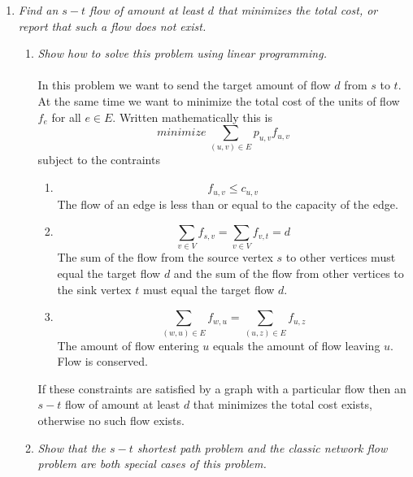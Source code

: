 \documentclass[12pt]{article}
\begin{document}
\begin{enumerate}
  \newpage
  \item \textit{Find an $s-t$ flow of amount at least $d$ that minimizes the
  total cost, or report that such a flow does not exist.}
  \begin{enumerate}
    \item \textit{Show how to solve this problem using linear programming.}\\
    \\
    In this problem we want to send the target amount of flow $d$ from $s$ to
    $t$.  At the same time we want to minimize the total cost of the units
    of flow $f_e$ for all $e \in E$.  Written mathematically this is 
    $$
    minimize \, \sum_{(u,v) \in E} p_{u,v}f_{u,v}
    $$
    subject to the contraints
    \begin{enumerate}
      
      \item 
      $$
      f_{u,v} \le c_{u,v}
      $$
      The flow of an edge is less than or equal to the capacity of the edge. 
      
      \item
      $$
      \sum_{v \in V} f_{s,v} = \sum_{v \in V} f_{v,t} = d
      $$
      The sum of the flow from the source vertex $s$ to other vertices must
      equal the target flow $d$ and the sum of the flow from other vertices to
      the sink vertex $t$ must equal the target flow $d$.
      
      \item
      $$
      \sum_{(w,u) \in E} f_{w,u} = \sum_{(u,z) \in E} f_{u,z}
      $$
      The amount of flow entering $u$ equals the amount of flow leaving $u$.
      Flow is conserved.
    \end{enumerate}
    If these constraints are satisfied by a graph with a particular flow then an
    $s-t$ flow of amount at least $d$ that minimizes the total cost exists,
    otherwise no such flow exists.
    
    
    \item \textit{Show that the $s-t$ shortest path problem and the classic
    network flow problem are both special cases of this problem.}
  \end{enumerate}

\end{enumerate}
\end{document}
